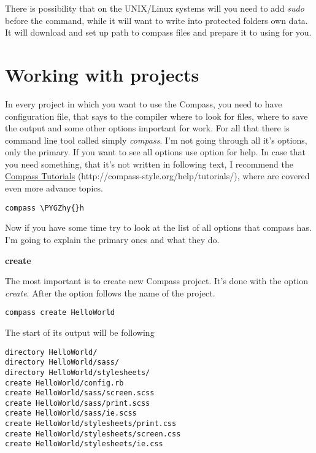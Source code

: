 \documentclass[a4paper,12pt,oneside,pdftex]{sphinxmanual}
\def\PYGZhy{\char`\-}
\begin{document}
There is possibility that on the UNIX/Linux systems will you need to add \emph{sudo} before the command, while it will want to write into protected folders own data. It will download and set up path to compass files and prepare it to using for you.


\section{Working with projects}
\label{src/compass:working-with-projects}
In every project in which you want to use the Compass, you need to have configuration file, that says to the compiler where to look for files, where to save the output and some other options important for work. For all that there is command line tool called simply \emph{compass}. I'm not going through all it's options, only the primary. If you want to see all options use option for help. In case that you need something, that it's not written in following text, I recommend the \href{http://compass-style.org/help/tutorials/}{Compass Tutorials} (http://compass-style.org/help/tutorials/), where are covered even more advance topics.

\begin{Verbatim}[commandchars=\\\{\}]
compass \PYGZhy{}h
\end{Verbatim}

Now if you have some time try to look at the list of all options that compass has. I'm going to explain the primary ones and what they do.

\textbf{create}

The most important is to create new Compass project. It's done with the option \emph{create}. After the option follows the name of the project.

\begin{Verbatim}[commandchars=\\\{\}]
compass create HelloWorld
\end{Verbatim}

The start of its output will be following

\begin{Verbatim}[commandchars=\\\{\}]
directory HelloWorld/
directory HelloWorld/sass/
directory HelloWorld/stylesheets/
create HelloWorld/config.rb
create HelloWorld/sass/screen.scss
create HelloWorld/sass/print.scss
create HelloWorld/sass/ie.scss
create HelloWorld/stylesheets/print.css
create HelloWorld/stylesheets/screen.css
create HelloWorld/stylesheets/ie.css
\end{Verbatim}
\end{document}
